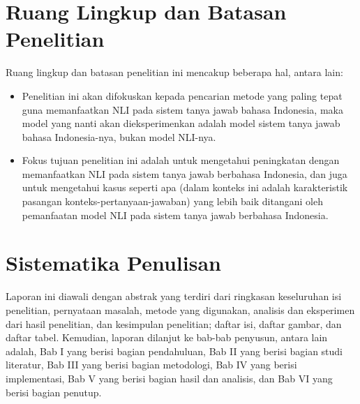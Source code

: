 \section{Ruang Lingkup dan Batasan Penelitian}
\label{1.5}
Ruang lingkup dan batasan penelitian ini mencakup beberapa hal, antara lain:

\begin{itemize}

    \item Penelitian ini akan difokuskan kepada pencarian metode yang paling tepat guna memanfaatkan NLI pada sistem tanya jawab bahasa Indonesia, maka model yang nanti akan dieksperimenkan adalah model sistem tanya jawab bahasa Indonesia-nya, bukan model NLI-nya.

    \item Fokus tujuan penelitian ini adalah untuk mengetahui peningkatan dengan memanfaatkan NLI pada sistem tanya jawab berbahasa Indonesia, dan juga untuk mengetahui kasus seperti apa (dalam konteks ini adalah karakteristik pasangan konteks-pertanyaan-jawaban) yang lebih baik ditangani oleh pemanfaatan model NLI pada sistem tanya jawab berbahasa Indonesia.
    
\end{itemize}

\section{Sistematika Penulisan}
\label{1.6}
Laporan ini diawali dengan abstrak yang terdiri dari ringkasan keseluruhan isi penelitian, pernyataan masalah, metode yang digunakan, analisis dan eksperimen dari hasil penelitian, dan kesimpulan penelitian; daftar isi, daftar gambar, dan daftar tabel. Kemudian, laporan dilanjut ke bab-bab penyusun, antara lain adalah, Bab I yang berisi bagian pendahuluan, Bab II yang berisi bagian studi literatur, Bab III yang berisi bagian metodologi, Bab IV yang berisi implementasi, Bab V yang berisi bagian hasil dan analisis, dan Bab VI yang berisi bagian penutup. 

